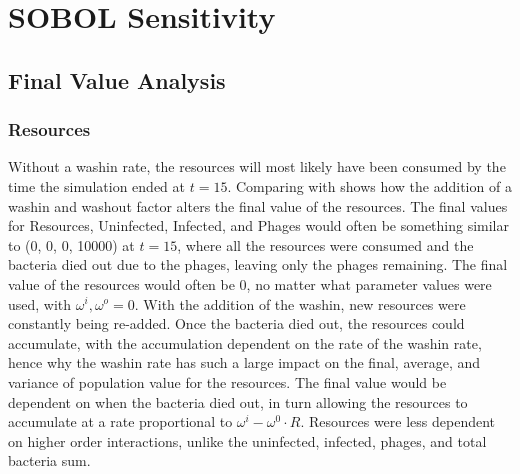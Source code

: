 \section{SOBOL Sensitivity}
\subsection{Final Value Analysis}
\subsubsection{Resources}
Without a washin rate, the resources will most likely have been consumed by the time the simulation ended at $t=15$. 
Comparing  with  shows how the addition of a washin and washout factor alters the final value of the resources. 
The final values for Resources, Uninfected, Infected, and Phages would often be something similar to (0, 0, 0, 10000) at $t=15$, where all the resources were consumed and the bacteria died out due to the phages, leaving only the phages remaining. 
The final value of the resources would often be 0, no matter what parameter values were used, with $\omega^i, \omega^o = 0$. 
With the addition of the washin, new resources were constantly being re-added. 
Once the bacteria died out, the resources could accumulate, with the accumulation dependent on the rate of the washin rate, hence why the washin rate has such a large impact on the final, average, and variance of population value for the resources. 
The final value would be dependent on when the bacteria died out, in turn allowing the resources to accumulate at a rate proportional to $\omega^i - \omega^0\cdot R$. 
Resources were less dependent on higher order interactions, unlike the uninfected, infected, phages, and total bacteria sum. 

